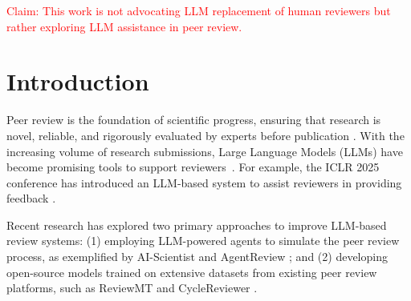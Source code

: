 \documentclass{article}
\begin{document}
\vspace{.5cm}
\textcolor{red}{ \normalsize Claim: This work is not advocating LLM replacement of human reviewers but rather exploring LLM assistance in peer review.}
\section{Introduction}
Peer review is the foundation of scientific progress, ensuring that research is novel, reliable, and rigorously evaluated by experts before publication \citep{alberts2008reviewing}. With the increasing volume of research submissions, Large Language Models (LLMs) have become promising tools to support reviewers~\citep{yang-etal-2024-large-language,chris2024the,li2024automated,scherbakov2024emergencelargelanguagemodels,si2025can}. For example, the ICLR 2025 conference has introduced an LLM-based system to assist reviewers in providing feedback \cite{iclr2025}. %

Recent research has explored two primary approaches to improve LLM-based review systems: (1) employing LLM-powered agents to simulate the peer review process, as exemplified by AI-Scientist \citep{chris2024the} and AgentReview \citep{jin-etal-2024-agentreview}; and (2) developing open-source models trained on extensive datasets from existing peer review platforms, such as ReviewMT \citep{tan2024peerreviewmultiturnlongcontext} and CycleReviewer \citep{yixuan2024cycleresearcher}.%

\end{document}
